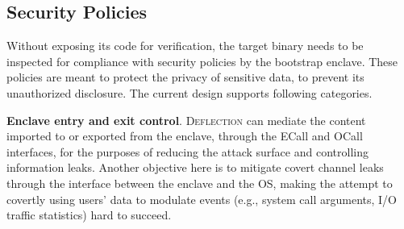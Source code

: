 
\subsection{Security Policies}\label{subsec-policies}

Without exposing its code for verification, the target binary needs to be inspected for compliance with security policies by the bootstrap enclave. These policies are meant to protect the privacy of sensitive data, to prevent its unauthorized disclosure. The current design supports following categories. 


\vspace{3pt}\noindent\textbf {Enclave entry and exit control}. 
\textsc{Deflection} can mediate the content imported to or exported from the enclave, through the ECall and OCall interfaces, for the purposes of reducing the attack surface and controlling information leaks. 
Another objective here is to mitigate covert channel leaks through the interface between the enclave and the OS, making the attempt to covertly using users’ data to modulate events (e.g., system call arguments, I/O traffic statistics) hard to succeed.



